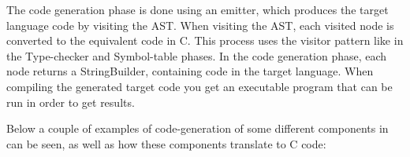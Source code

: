 The code generation phase is done using an emitter, which produces the target language code by visiting the AST. When visiting the AST, each visited node is converted to the equivalent code in C. This process uses the visitor pattern like in the Type-checker and Symbol-table phases. In the code generation phase, each node returns a StringBuilder, containing code in the target language. When compiling the generated target code you get an executable program that can be run in order to get results.



Below a couple of examples of code-generation of some different components in \lang can be seen, as well as how these components translate to C code:


